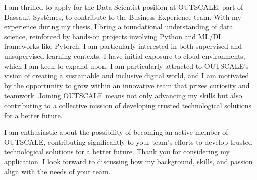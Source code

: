 \documentclass[11pt,a4paper]{lettre}
\begin{document}
\begin{letter}
I am thrilled to apply for the Data Scientist position at OUTSCALE, part of Dassault Systèmes, to contribute to the Business Experience team. With my experience during my thesis,  
I bring a foundational understanding of data science, reinforced by hands-on projects involving Python and ML/DL frameworks like Pytorch. 
I am particularly interested in both supervised and unsupervised learning contexts. I have initial exposure to cloud environments, which I am keen to expand upon. I am particularly attracted to OUTSCALE's vision of creating a sustainable and inclusive digital world, and I am motivated by the opportunity to grow within an innovative team that prizes curiosity and teamwork. Joining OUTSCALE means not only advancing my skills but also contributing to a collective mission of developing trusted technological solutions for a better future.
\closing{\hspace{1em}
I am enthusiastic about the possibility of becoming an active member of OUTSCALE, contributing significantly to your team's efforts to develop trusted technological solutions for a better future. Thank you for considering my application. I look forward to discussing how my background, skills, and passion align with the needs of your team.
}
\end{letter}
\end{document}
